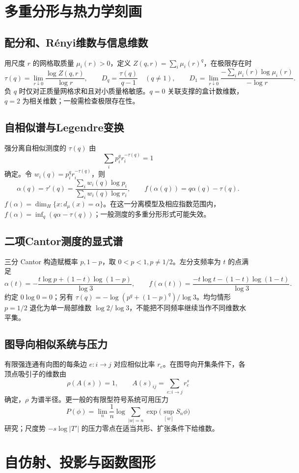 \documentclass[../main.tex]{subfiles}
\begin{document}
\section{多重分形与热力学刻画}
\subsection{配分和、Rényi维数与信息维数}
用尺度 $r$ 的网格取质量 $\mu_i(r)>0$，定义 $Z(q,r)=\sum_i\mu_i(r)^q$，在极限存在时
\[
\tau(q)=\lim_{r\downarrow0}\frac{\log Z(q,r)}{\log r},\qquad
D_q=\frac{\tau(q)}{q-1}\quad(q\ne1),\qquad
D_1=\lim_{r\downarrow0}\frac{-\sum_i\mu_i(r)\log\mu_i(r)}{-\log r}.
\]
负 $q$ 时仅对正质量网格求和且对小质量格敏感。$q=0$ 关联支撑的盒计数维数，$q=2$ 为相关维数；一般需检查极限存在性。
\subsection{自相似谱与Legendre变换}
强分离自相似测度的 $\tau(q)$ 由
\[
\sum_ip_i^qr_i^{-\tau(q)}=1
\]
确定。令 $w_i(q)=p_i^qr_i^{-\tau(q)}$，则
\[
\alpha(q)=\tau'(q)=\frac{\sum_iw_i(q)\log p_i}{\sum_iw_i(q)\log r_i},\qquad
f(\alpha(q))=q\alpha(q)-\tau(q).
\]
$f(\alpha)=\dim_H\{x:d_\mu(x)=\alpha\}$。在这一分离模型及相应指数范围内，$f(\alpha)=\inf_q(q\alpha-\tau(q))$；一般测度的多重分形形式可能失效。
\subsection{二项Cantor测度的显式谱}
三分 Cantor 构造赋概率 $p,1-p$，取 $0<p<1,p\ne1/2$。左分支频率为 $t$ 的点满足
\[
\alpha(t)=-\frac{t\log p+(1-t)\log(1-p)}{\log3},\qquad
f(\alpha(t))=\frac{-t\log t-(1-t)\log(1-t)}{\log3}.
\]
约定 $0\log0=0$；另有 $\tau(q)=-\log(p^q+(1-p)^q)/\log3$。均匀情形 $p=1/2$ 退化为单一局部维数 $\log2/\log3$，不能把不同频率继续当作不同维数水平集。
\subsection{图导向相似系统与压力}
有限强连通有向图的每条边 $e:i\to j$ 对应相似比率 $r_e$。在图导向开集条件下，各顶点吸引子的维数由
\[
\rho(A(s))=1,\qquad A(s)_{ij}=\sum_{e:i\to j}r_e^s
\]
确定，$\rho$ 为谱半径。更一般的有限型符号系统可用压力
\[
P(\phi)=\lim_n\frac1n\log\sum_{|w|=n}\exp\bigl(\sup_{[w]}S_n\phi\bigr)
\]
研究；尺度势 $-s\log|T'|$ 的压力零点在适当共形、扩张条件下给维数。
\section{自仿射、投影与函数图形}
\end{document}
